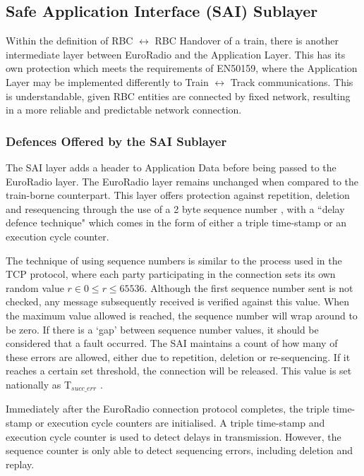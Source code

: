 \documentclass[twoside,11pt,a4paper]{article}
\begin{document}
\subsection{Safe Application Interface (SAI) Sublayer}
Within the definition of RBC $\leftrightarrow$ RBC Handover of a train, there is another intermediate layer between EuroRadio and the Application Layer. This has its own protection which meets the requirements of EN50159, where the Application Layer may be implemented differently to Train $\leftrightarrow$ Track communications. This is understandable, given RBC entities are connected by fixed network, resulting in a more reliable and predictable network connection. 

\subsubsection{Defences Offered by the SAI Sublayer}
The SAI layer adds a header to Application Data before being passed to the EuroRadio layer. The EuroRadio layer remains unchanged when compared to the train-borne counterpart. This layer offers protection against repetition, deletion and resequencing through the use of a 2 byte sequence number \citep[p. 21]{SUBSET-098}, with a ``delay defence technique" \citep[p. 15]{SUBSET-098} which comes in the form of either a triple time-stamp or an execution cycle counter.

The technique of using sequence numbers is similar to the process used in the TCP protocol, where each party participating in the connection sets its own random value $r \in 0 \leq r \leq 65536$. Although the first sequence number sent is not checked, any message subsequently received is verified against this value. When the maximum value allowed is reached, the sequence number will wrap around to be zero. If there is a `gap' between sequence number values, it should be considered that a fault occurred. The SAI maintains a count of how many of these errors are allowed, either due to repetition, deletion or re-sequencing. If it reaches a certain set threshold, the connection will be released. This value is set nationally as T$_{succ\_err}$ \citep[Section 5.4.10]{SUBSET-098}. 

Immediately after the EuroRadio connection protocol completes, the triple time-stamp or execution cycle counters are initialised. A triple time-stamp and execution cycle counter is used to detect delays in transmission. However, the sequence counter is only able to detect sequencing errors, including deletion and replay.
\end{document}
